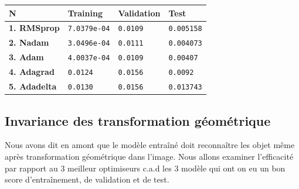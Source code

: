 	\begin{table}[H]
		\centering
		\begin{tabular}{|l|p{3cm}|p{3cm}|p{3cm}|}
			\hline
			\textbf{N\textdegree} & \textbf{Training} & \textbf{Validation} & \textbf{Test} \\
			\hline
			\textbf{1. RMSprop} &
			\texttt{7.0379e-04} &
			\texttt{0.0109} &
			\texttt{0.005158} \\
			\hline
			\textbf{2. Nadam} &
			\texttt{3.0496e-04} &
			\texttt{0.0111} &
			\texttt{0.004073} \\
			\hline
			\textbf{3. Adam} &
			\texttt{4.0037e-04} &
			\texttt{0.0109} &
			\texttt{0.00407} \\
			\hline
			\textbf{4. Adagrad} &
			\texttt{0.0124} &
			\texttt{0.0156} &
			\texttt{0.0092} \\
			\hline
			\textbf{5. Adadelta} &
			\texttt{0.0130} &
			\texttt{0.0156} &
			\texttt{0.013743} \\
			\hline
		\end{tabular}
	\end{table}
	
	
	
	\subsection{Invariance des transformation géométrique}
	
	
	

	
	
	Nous avons dit en amont que le modèle entraîné doit reconnaître les objet même après transformation géométrique dans l’image. Nous allons examiner l'efficacité par rapport au 3 meilleur optimiseurs c.a.d les 3 modèle qui ont on eu un bon score d'entraînement, de validation et de test.
	
